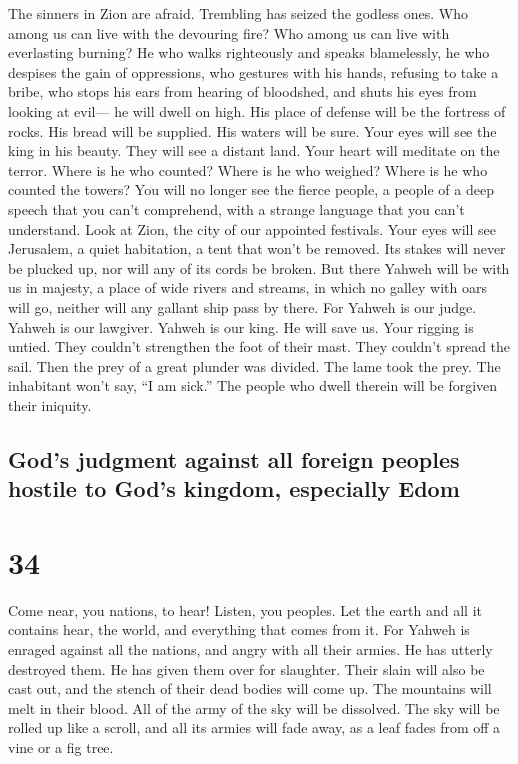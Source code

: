  The sinners in Zion are afraid. Trembling has seized the
godless ones. Who among us can live with the devouring fire? Who among
us can live with everlasting burning?  He who walks
righteously and speaks blamelessly, he who despises the gain of
oppressions, who gestures with his hands, refusing to take a bribe, who
stops his ears from hearing of bloodshed, and shuts his eyes from
looking at evil---  he will dwell on high. His place of
defense will be the fortress of rocks. His bread will be supplied. His
waters will be sure.  Your eyes will see the king in his
beauty. They will see a distant land.  Your heart will
meditate on the terror. Where is he who counted? Where is he who
weighed? Where is he who counted the towers?  You will no
longer see the fierce people, a people of a deep speech that you can't
comprehend, with a strange language that you can't understand.
 Look at Zion, the city of our appointed festivals. Your
eyes will see Jerusalem, a quiet habitation, a tent that won't be
removed. Its stakes will never be plucked up, nor will any of its cords
be broken.  But there Yahweh will be with us in majesty,
a place of wide rivers and streams, in which no galley with oars will
go, neither will any gallant ship pass by there.  For
Yahweh is our judge. Yahweh is our lawgiver. Yahweh is our king. He will
save us.  Your rigging is untied. They couldn't
strengthen the foot of their mast. They couldn't spread the sail. Then
the prey of a great plunder was divided. The lame took the prey.
 The inhabitant won't say, ``I am sick.'' The people who
dwell therein will be forgiven their iniquity.

\hypertarget{gods-judgment-against-all-foreign-peoples-hostile-to-gods-kingdom-especially-edom}{%
\subsection{God's judgment against all foreign peoples hostile to God's
kingdom, especially
Edom}\label{gods-judgment-against-all-foreign-peoples-hostile-to-gods-kingdom-especially-edom}}

\hypertarget{section-33}{%
\section{34}\label{section-33}}

 Come near, you nations, to hear! Listen, you peoples. Let
the earth and all it contains hear, the world, and everything that comes
from it.  For Yahweh is enraged against all the nations,
and angry with all their armies. He has utterly destroyed them. He has
given them over for slaughter.  Their slain will also be
cast out, and the stench of their dead bodies will come up. The
mountains will melt in their blood.  All of the army of
the sky will be dissolved. The sky will be rolled up like a scroll, and
all its armies will fade away, as a leaf fades from off a vine or a fig
tree.

